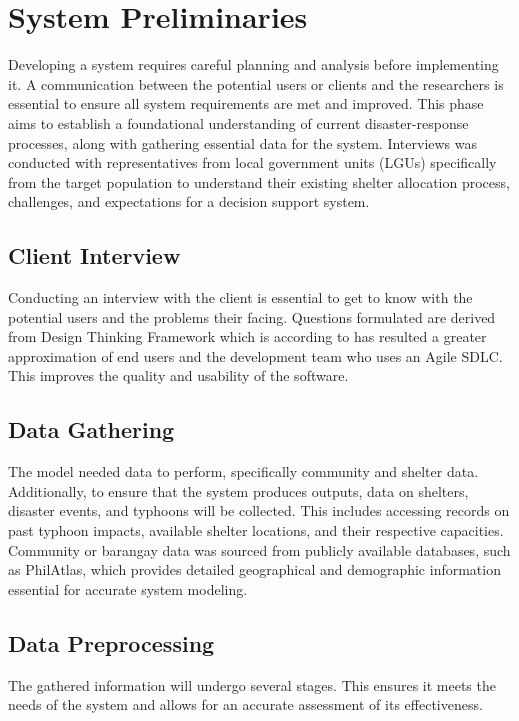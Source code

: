 \section{System Preliminaries}
	Developing a system requires careful planning and analysis before implementing it. A communication between the potential users or clients and the researchers is essential to ensure all system requirements are met and improved. This phase aims to establish a foundational understanding of current disaster-response processes, along with gathering essential data for the system. Interviews was conducted with representatives from local government units (LGUs) specifically from the target population to understand their existing shelter allocation process, challenges, and expectations for a decision support system. 
	
\subsection{Client Interview}
	Conducting an interview with the client is essential to get to know with the potential users and the problems their facing. Questions formulated are derived from Design Thinking Framework which is according to \textcite{Julio2018} has resulted a greater approximation of end users and the development team who uses an Agile SDLC. This improves the quality and usability of the software.
	
\subsection{Data Gathering}
	The model needed data to perform, specifically community and shelter data. Additionally, to ensure that the system produces outputs, data on shelters, disaster events, and typhoons will be collected. This includes accessing records on past typhoon impacts, available shelter locations, and their respective capacities. Community or barangay data was sourced from publicly available databases, such as PhilAtlas, which provides detailed geographical and demographic information essential for accurate system modeling.
	
\subsection{Data Preprocessing}
	The gathered information will undergo several stages. This ensures it meets the needs of the system and allows for an accurate assessment of its effectiveness.
	

